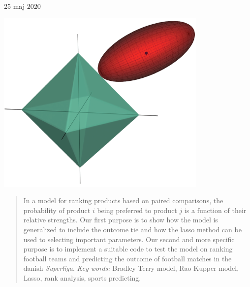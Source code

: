 \documentclass[11pt,a4paper]{article}
\begin{document}
\begin{titlepage}
	
	
	\vfill\vfill\vfill %
	
	{\large{25 maj 2020}} %
	
	
	\includegraphics[width=0.7 \textwidth]{GLR2.png}\\[1cm]%
	 
	
	\vfill %
	
\end{titlepage}
\begin{abstract}
In a model for ranking products based on paired comparisons, the probability of product $i$ being preferred to product $j$ is a function of their relative strengths. Our first purpose is to show how the model is generalized to include the outcome tie and how the lasso method can be used to selecting important parameters. Our second and more specific purpose is to implement a suitable code to test the model on ranking football teams and predicting the outcome of football matches in the danish \textit{Superliga}.\newline\newline
\textit{Key words: }\;\;\; Bradley-Terry model, Rao-Kupper model, Lasso, rank analysis, sports predicting. 
\end{abstract}
\end{document}
